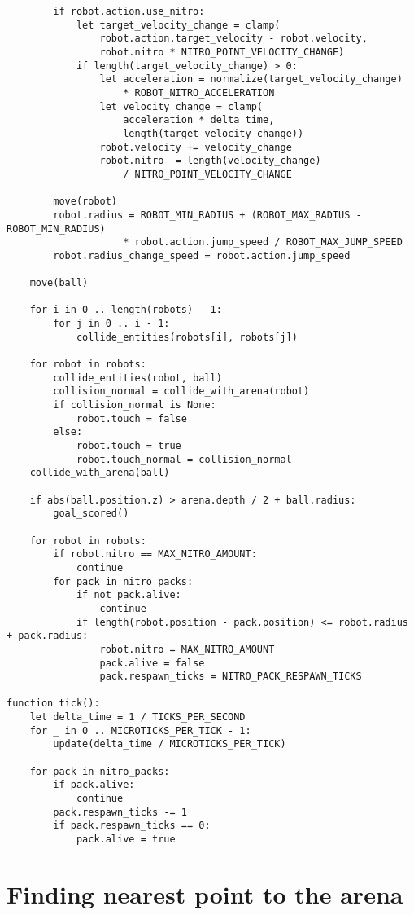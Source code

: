 \begin{verbatim}
        if robot.action.use_nitro:
            let target_velocity_change = clamp(
                robot.action.target_velocity - robot.velocity,
                robot.nitro * NITRO_POINT_VELOCITY_CHANGE)
            if length(target_velocity_change) > 0:
                let acceleration = normalize(target_velocity_change)
                    * ROBOT_NITRO_ACCELERATION
                let velocity_change = clamp(
                    acceleration * delta_time,
                    length(target_velocity_change))
                robot.velocity += velocity_change
                robot.nitro -= length(velocity_change)
                    / NITRO_POINT_VELOCITY_CHANGE

        move(robot)
        robot.radius = ROBOT_MIN_RADIUS + (ROBOT_MAX_RADIUS - ROBOT_MIN_RADIUS)
                    * robot.action.jump_speed / ROBOT_MAX_JUMP_SPEED
        robot.radius_change_speed = robot.action.jump_speed

    move(ball)

    for i in 0 .. length(robots) - 1:
        for j in 0 .. i - 1:
            collide_entities(robots[i], robots[j])

    for robot in robots:
        collide_entities(robot, ball)
        collision_normal = collide_with_arena(robot)
        if collision_normal is None:
            robot.touch = false
        else:
            robot.touch = true
            robot.touch_normal = collision_normal
    collide_with_arena(ball)

    if abs(ball.position.z) > arena.depth / 2 + ball.radius:
        goal_scored()

    for robot in robots:
        if robot.nitro == MAX_NITRO_AMOUNT:
            continue
        for pack in nitro_packs:
            if not pack.alive:
                continue
            if length(robot.position - pack.position) <= robot.radius + pack.radius:
                robot.nitro = MAX_NITRO_AMOUNT
                pack.alive = false
                pack.respawn_ticks = NITRO_PACK_RESPAWN_TICKS

function tick():
    let delta_time = 1 / TICKS_PER_SECOND
    for _ in 0 .. MICROTICKS_PER_TICK - 1:
        update(delta_time / MICROTICKS_PER_TICK)

    for pack in nitro_packs:
        if pack.alive:
            continue
        pack.respawn_ticks -= 1
        if pack.respawn_ticks == 0:
            pack.alive = true
\end{verbatim}

\section{Finding nearest point to the arena}

